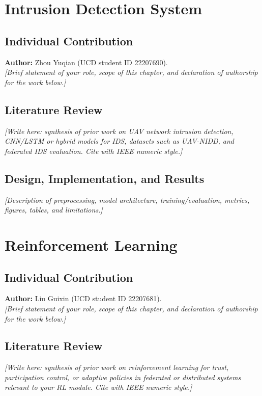 \documentclass[11pt,a4paper,oneside]{report}
\begin{document}
\chapter{Intrusion Detection System}
\label{ch:ids}

\section{Individual Contribution}
\label{sec:individual-zhou}
\noindent\textbf{Author:} Zhou Yuqian (UCD student ID 22207690).\\
\textit{[Brief statement of your role, scope of this chapter, and declaration of authorship for the work below.]}

\section{Literature Review}
\label{sec:lit-zhou}
\textit{[Write here: synthesis of prior work on UAV network intrusion detection, CNN/LSTM or hybrid models for IDS, datasets such as UAV-NIDD, and federated IDS evaluation. Cite with IEEE numeric style.]}

\section{Design, Implementation, and Results}
\label{sec:ids-work}
\textit{[Description of preprocessing, model architecture, training/evaluation, metrics, figures, tables, and limitations.]}


\chapter{Reinforcement Learning}
\label{ch:rl}

\section{Individual Contribution}
\label{sec:individual-liu}
\noindent\textbf{Author:} Liu Guixin (UCD student ID 22207681).\\
\textit{[Brief statement of your role, scope of this chapter, and declaration of authorship for the work below.]}

\section{Literature Review}
\label{sec:lit-liu}
\textit{[Write here: synthesis of prior work on reinforcement learning for trust, participation control, or adaptive policies in federated or distributed systems relevant to your RL module. Cite with IEEE numeric style.]}
\end{document}
